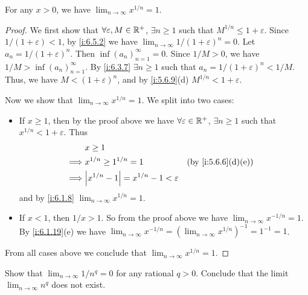 \begin{lem}\label{i:6.5.3}
  For any \(x > 0\), we have \(\lim_{n \to \infty} x^{1 / n} = 1\).
\end{lem}

\begin{proof}
  We first show that \(\forall \varepsilon, M \in \mathbb{R}^+\), \(\exists n \geq 1\) such that \(M^{1 / n} \leq 1 + \varepsilon\).
  Since \(1 / (1 + \varepsilon) < 1\), by \cref{i:6.5.2} we have \(\lim_{n \to \infty} 1 / (1 + \varepsilon)^n = 0\).
  Let \(a_n = 1 / (1 + \varepsilon)^n\).
  Then \(\inf(a_n)_{n = 1}^\infty = 0\).
  Since \(1 / M > 0\), we have \(1 / M > \inf(a_n)_{n = 1}^\infty\).
  By \cref{i:6.3.7} \(\exists n \geq 1\) such that \(a_n = 1 / (1 + \varepsilon)^n < 1 / M\).
  Thus, we have \(M < (1 + \varepsilon)^n\), and by \cref{i:5.6.9}(d) \(M^{1 / n} < 1 + \varepsilon\).

  Now we show that \(\lim_{n \to \infty} x^{1 / n} = 1\).
  We split into two cases:
  \begin{itemize}
    \item If \(x \geq 1\), then by the proof above we have \(\forall \varepsilon \in \mathbb{R}^+\), \(\exists n \geq 1\) such that \(x^{1 / n} < 1 + \varepsilon\).
          Thus
          \begin{align*}
                     & x \geq 1                                                                 \\
            \implies & x^{1 / n} \geq 1^{1 / n} = 1                      &  & \by{i:5.6.6}[d,e] \\
            \implies & \abs{x^{1 / n} - 1} = x^{1 / n} - 1 < \varepsilon
          \end{align*}
          and by \cref{i:6.1.8} \(\lim_{n \to \infty} x^{1 / n} = 1\).
    \item If \(x < 1\), then \(1 / x > 1\).
          So from the proof above we have \(\lim_{n \to \infty} x^{-1 / n} = 1\).
          By \cref{i:6.1.19}(e) we have \(\lim_{n \to \infty} x^{-1 / n} = (\lim_{n \to \infty} x^{1 / n})^{-1} = 1^{-1} = 1\).
  \end{itemize}
  From all cases above we conclude that \(\lim_{n \to \infty} x^{1 / n} = 1\).
\end{proof}

\exercisesection

\begin{ex}\label{i:ex:6.5.1}
  Show that \(\lim_{n \to \infty} 1 / n^q = 0\) for any rational \(q > 0\).
  Conclude that the limit \(\lim_{n \to \infty} n^q\) does not exist.
\end{ex}

